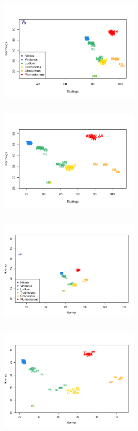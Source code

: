 \documentclass[12pt]{article}
\begin{document}
\begin{figure}
	\centering
			{\includegraphics[width=2.8in,height=2.3in]{figs/warblers/warb_ind_noad.pdf}}
			{\includegraphics[width=2.8in,height=2.3in]{figs/warblers/warb_ind_noad_closeup.pdf}}
			{\includegraphics[width=2.8in,height=2.3in]{figs/warblers/individual_warbler_map_arrows_randpr1.pdf}}
			{\includegraphics[width=2.8in,height=2.3in]{figs/warblers/individual_warbler_map_arrows_randpr1_closeup.pdf}}

\end{figure}
\end{document}
